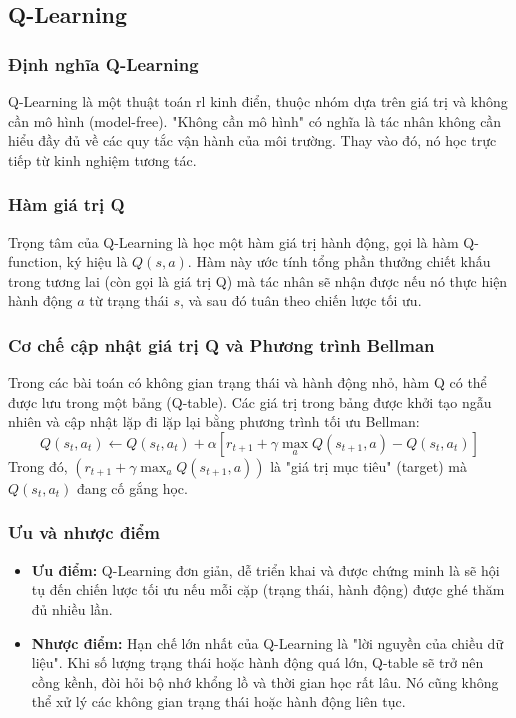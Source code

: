 \begin{enumerate}
\subsection{Q-Learning}
\subsubsection{Định nghĩa Q-Learning}
Q-Learning là một thuật toán \ac{rl} kinh điển, thuộc nhóm dựa trên giá trị và không
cần mô hình (model-free). "Không cần mô hình" có nghĩa là tác nhân không cần
hiểu đầy đủ về các quy tắc vận hành của môi trường. Thay vào đó, nó học trực
tiếp từ kinh nghiệm tương tác.

\subsubsection{Hàm giá trị Q}
Trọng tâm của Q-Learning là học một hàm giá trị hành động, gọi là hàm Q-function,
ký hiệu là $Q(s, a)$. Hàm này ước tính tổng phần thưởng chiết khấu trong tương lai
(còn gọi là giá trị Q) mà tác nhân sẽ nhận được nếu nó thực hiện hành động $a$ từ
trạng thái $s$, và sau đó tuân theo chiến lược tối ưu.

\subsubsection{Cơ chế cập nhật giá trị Q và Phương trình Bellman}
Trong các bài toán có không gian trạng thái và hành động nhỏ, hàm Q có thể được lưu
trong một bảng (Q-table). Các giá trị trong bảng được khởi tạo ngẫu nhiên và cập
nhật lặp đi lặp lại bằng phương trình tối ưu Bellman:
\begin{equation}
    Q(s_{t}, a_{t}) \leftarrow Q(s_{t}, a_{t}) + \alpha [r_{t+1}+ \gamma \max_{a}
    Q(s_{t+1}, a) - Q(s_{t}, a_{t})]
\end{equation}
Trong đó, $(r_{t+1}+ \gamma \max_{a}Q(s_{t+1}, a))$ là "giá trị mục tiêu" (target)
mà $Q(s_{t}, a_{t})$ đang cố gắng học.

\subsubsection{Ưu và nhược điểm}
\begin{itemize}
    \item \textbf{Ưu điểm:} Q-Learning đơn giản, dễ triển khai và được chứng minh
        là sẽ hội tụ đến chiến lược tối ưu nếu mỗi cặp (trạng thái, hành động)
        được ghé thăm đủ nhiều lần.

    \item \textbf{Nhược điểm:} Hạn chế lớn nhất của Q-Learning là "lời nguyền của
        chiều dữ liệu". Khi số lượng trạng thái hoặc hành động quá lớn, Q-table
        sẽ trở nên cồng kềnh, đòi hỏi bộ nhớ khổng lồ và thời gian học rất lâu.
        Nó cũng không thể xử lý các không gian trạng thái hoặc hành động liên
        tục.
\end{itemize}


\end{enumerate}
